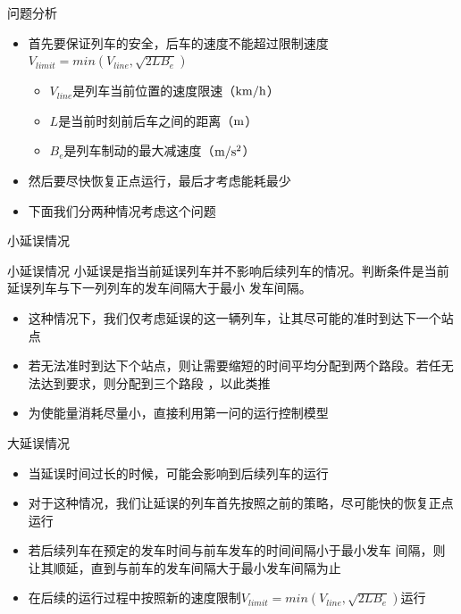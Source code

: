 \documentclass{beamer}
\begin{document}
\begin{frame}{问题分析}
\begin{itemize}
  \item<1-> 首先要保证列车的安全，后车的速度不能超过限制速度$V_{limit} = min(V_{line}, \sqrt{2LB_e})$
  \begin{itemize}
    \item<2-> $V_{line}$是列车当前位置的速度限速（$ \rm km/h$）
    \item<3-> $L$是当前时刻前后车之间的距离（$\rm m$）
    \item<4-> $B_e$是列车制动的最大减速度（$\rm m/s^2$）
  \end{itemize}
  \item<5-> 然后要尽快恢复正点运行，最后才考虑能耗最少
  \item<6-> 下面我们分两种情况考虑这个问题
\end{itemize}
\end{frame}

\begin{frame}{小延误情况}
\begin{block}{小延误情况}
小延误是指当前延误列车并不影响后续列车的情况。判断条件是当前延误列车与下一列列车的发车间隔大于最小
发车间隔。
\end{block}
\begin{itemize}
  \item<1-> 这种情况下，我们仅考虑延误的这一辆列车，让其尽可能的准时到达下一个站点
  \item<2-> 若无法准时到达下个站点，则让需要缩短的时间平均分配到两个路段。若任无法达到要求，则分配到三个路段
  ，以此类推
  \item<3-> 为使能量消耗尽量小，直接利用第一问的运行控制模型
\end{itemize}
\end{frame}

\begin{frame}{大延误情况}
\begin{itemize}
  \item<1-> 当延误时间过长的时候，可能会影响到后续列车的运行
  \item<2-> 对于这种情况，我们让延误的列车首先按照之前的策略，尽可能快的恢复正点运行
  \item<3-> 若后续列车在预定的发车时间与前车发车的时间间隔小于最小发车
  间隔，则让其顺延，直到与前车的发车间隔大于最小发车间隔为止
  \item<4-> 在后续的运行过程中按照新的速度限制$V_{limit} = min(V_{line}, \sqrt{2LB_e})$运行
\end{itemize}
\end{frame}
\end{document}
